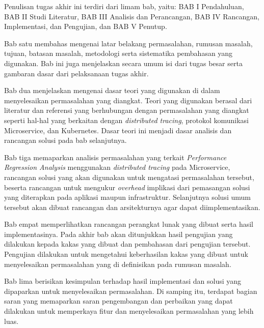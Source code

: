 Penulisan tugas akhir ini terdiri dari limam bab, yaitu: BAB I Pendahuluan, BAB II Studi Literatur, BAB III Analisis dan Perancangan, BAB IV Rancangan, Implementasi, dan Pengujian, dan BAB V Penutup.

Bab satu membahas mengenai latar belakang permasalahan, rumusan masalah, tujuan, batasan masalah, metodologi serta sistematika pembahasan yang digunakan. Bab ini juga menjelaskan secara umum isi dari tugas besar serta gambaran dasar dari pelaksanaan tugas akhir.

Bab dua menjelaskan mengenai dasar teori yang digunakan di dalam menyelesaikan permasalahan yang diangkat. Teori yang digunakan berasal dari literatur dan referensi yang berhubungan dengan permasalahan yang diangkat seperti hal-hal yang berkaitan dengan \textit{distributed tracing}, protokol komunikasi Microservice, dan Kubernetes. Dasar teori ini menjadi dasar analisis dan rancangan solusi pada bab selanjutnya.

Bab tiga memaparkan analisis permasalahan yang terkait \textit{Performance Regression Analysis} menggunakan \textit{distributed tracing} pada Microservice, rancangan solusi yang akan digunakan untuk mengatasi permasalahan tersebut, beserta rancangan untuk mengukur \textit{overhead} implikasi dari pemasangan solusi yang diterapkan pada aplikasi maupun infrastruktur. Selanjutnya solusi umum tersebut akan dibuat rancangan dan arsitekturnya agar dapat diimplementasikan.

Bab empat memperlihatkan rancangan perangkat lunak yang dibuat serta hasil implementasinya. Pada akhir bab akan ditunjukkan hasil pengujian yang dilakukan kepada kakas yang dibuat dan pembahasan dari pengujian tersebut. Pengujian dilakukan untuk mengetahui keberhasilan kakas yang dibuat untuk menyelesaikan permasalahan yang di definisikan pada rumusan masalah.

Bab lima berisikan kesimpulan terhadap hasil implementasi dan solusi yang dipaparkan untuk menyelesaikan permasalahan. Di samping itu, terdapat bagian saran yang memaparkan saran pengembangan dan perbaikan yang dapat dilakukan untuk memperkaya fitur dan menyelesaikan permasalahan yang lebih luas.

